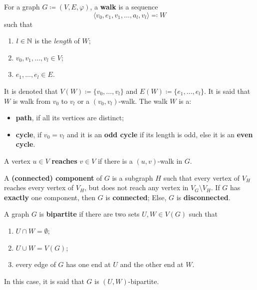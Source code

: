 \begin{definition}[Walk]
	\label{def:walk}
	For a graph \(G \coloneqq (V, E, \varphi)\), a \textbf{walk} is a sequence
	\[
		\langle v_0, e_1, v_1, \dots, a_l, v_l \rangle \eqqcolon W
	\]
	such that
	\begin{enumerate}[label=(\roman*)]
		\item \(l \in \mathbb{N}\) is the \textit{length} of \(W\);
		\item \(v_0, v_1, \dots, v_l \in V\);
		\item \(e_1, \dots, e_l \in E\).
	\end{enumerate}
	It is denoted that \(V(W) 
	\coloneqq \{v_0, \dots, v_l\}\) 
	and 
	\(E(W) \coloneqq \{e_1, \dots, e_l\}\). 
	It is said that \(W\) is walk from \(v_0\) to \(v_l\) or a \((v_0, v_l)\)-walk.
	The walk \(W\) is a:
	\begin{itemize}
		\item 
			\textbf{path}, if all its vertices are distinct;
		\item 
			\textbf{cycle}, if \(v_0 = v_l\) 
			and it is an \textbf{odd cycle} if its length is odd, else it is an \textbf{even cycle}.
	\end{itemize}
	A vertex \(u \in V\) \textbf{reaches} \(v \in V\) if there is a \((u,v)\)-walk in \(G\). 
\end{definition}

\begin{definition}[Components]
	\label{def:components}
	A \textbf{(connected) component} of \(G\) is a subgraph \(H\) such that every vertex of \(V_H\) reaches every vertex of \(V_H\), but does not reach any vertex in \(V_G \setminus V_H\).
	If \(G\) has \textbf{exactly} one component, then \(G\) is \textbf{connected}; Else, \(G\) is \textbf{disconnected}.
\end{definition}


\begin{definition}
	A graph \(G\) is \textbf{bipartite} if there are two sets \(U, W \in V(G)\) such that 
	\begin{enumerate}[label=(\roman*)]
		\item \(U \cap W = \emptyset\);
		\item \(U \cup W = V(G)\);
		\item every edge of \(G\) has one end at \(U\) and the other end at \(W\).
	\end{enumerate}
	In this case, it is said that \(G\) is \((U, W)\)-bipartite.
\end{definition}


